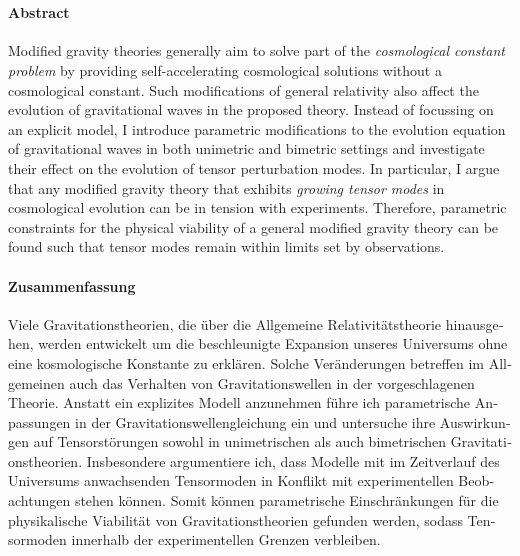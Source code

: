 \cleardoublepage
\thispagestyle{plain}

\makeatletter
\begin{center}
	\large\textbf{\@title}\\
	\normalsize\@author
\end{center}
\makeatother

\paragraph{Abstract}

Modified gravity theories generally aim to solve part of the \emph{cosmological constant problem} by providing self-accelerating cosmological solutions without a cosmological constant. Such modifications of general relativity also affect the evolution of gravitational waves in the proposed theory. Instead of focussing on an explicit model, I introduce parametric modifications to the evolution equation of gravitational waves in both unimetric and bimetric settings and investigate their effect on the evolution of tensor perturbation modes. In particular, I argue that any modified gravity theory that exhibits \emph{growing tensor modes} in cosmological evolution can be in tension with experiments. Therefore, parametric constraints for the physical viability of a general modified gravity theory can be found such that tensor modes remain within limits set by observations.

\begin{otherlanguage}{ngerman}

\paragraph{Zusammenfassung}

Viele Gravitationstheorien, die über die Allgemeine Relativitätstheorie hinausgehen, werden entwickelt um die beschleunigte Expansion unseres Universums ohne eine kosmologische Konstante zu erklären. Solche Veränderungen betreffen im Allgemeinen auch das Verhalten von Gravitationswellen in der vorgeschlagenen Theorie. Anstatt ein explizites Modell anzunehmen führe ich parametrische Anpassungen in der Gravitationswellengleichung ein und untersuche ihre Auswirkungen auf Tensorstörungen sowohl in unimetrischen als auch bimetrischen Gravitationstheorien. Insbesondere argumentiere ich, dass Modelle mit im Zeitverlauf des Universums anwachsenden Tensormoden in Konflikt mit experimentellen Beobachtungen stehen können. Somit können parametrische Einschränkungen für die physikalische Viabilität von Gravitationstheorien gefunden werden, sodass Tensormoden innerhalb der experimentellen Grenzen verbleiben.

\end{otherlanguage}
